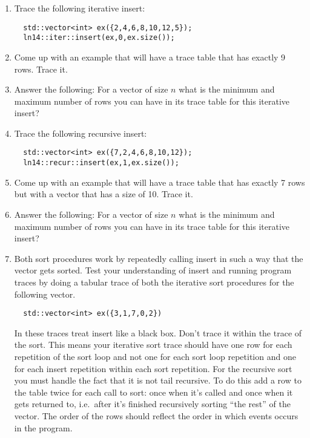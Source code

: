 \documentclass[nobib]{tufte-handout}
\begin{document}
\begin{enumerate}
  \item Trace the following iterative insert:
  \begin{lstlisting}
  std::vector<int> ex({2,4,6,8,10,12,5});
  ln14::iter::insert(ex,0,ex.size());
  \end{lstlisting}

  \item Come up with an example that will have a trace table that has exactly 9 rows. Trace it.

  \item Answer the following: For a vector of size \(n\) what is the minimum and maximum number of rows you can have in its trace table for this iterative insert?

  \item Trace the following recursive insert:
  \begin{lstlisting}
  std::vector<int> ex({7,2,4,6,8,10,12});
  ln14::recur::insert(ex,1,ex.size());
  \end{lstlisting}

  \item Come up with an example that will have a trace table that has exactly 7 rows but with a vector that has a size of 10. Trace it.

  \item Answer the following: For a vector of size \(n\) what is the minimum and maximum number of rows you can have in its trace table for this iterative insert?

  \item Both sort procedures work by repeatedly calling insert in such a way that the vector gets sorted. Test your understanding of insert and running program traces by doing a tabular trace of both the iterative sort procedures for the following vector.

  \begin{lstlisting}
  std::vector<int> ex({3,1,7,0,2})
  \end{lstlisting}

  In these traces treat insert like a black box. Don't trace it within the trace of the sort. This means your iterative sort trace should have one row for each repetition of the sort loop and not one for each sort loop repetition and one for each insert repetition within each sort repetition. For the recursive sort you must handle the fact that it is not tail recursive. To do this add a row to the table twice for each call to sort: once when it's called and once when it gets returned to, i.e.\ after it's finished recursively sorting ``the rest'' of the vector. The order of the rows should reflect the order in which events occurs in the program.

\end{enumerate}
\end{document}

